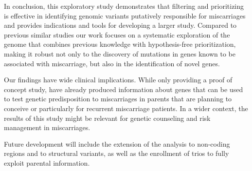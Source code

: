   
In conclusion, this exploratory study demonstrates that filtering and prioritizing is effective in identifying genomic variants putatively responsible for miscarriages and provides indications and tools for developing a larger study.  Compared to previous similar studies our work focuses on a systematic exploration of the genome that combines previous knowledge with hypothesis-free prioritization, making it robust not only to the discovery of mutations in genes known to be associated with miscarriage, but also in the identification of novel genes.


Our findings have wide clinical implications. While only providing a proof of concept study, have already produced information about genes that can be used to test genetic predisposition to miscarriages in parents that are planning to conceive or particularly for recurrent miscarriage patients. In a wider context, the results of this study might be relevant for genetic counseling and risk management in miscarriages.


Future development will include the extension of the analysis to non-coding regions and to structural variants, as well as the enrollment of trios to fully exploit parental information.  










